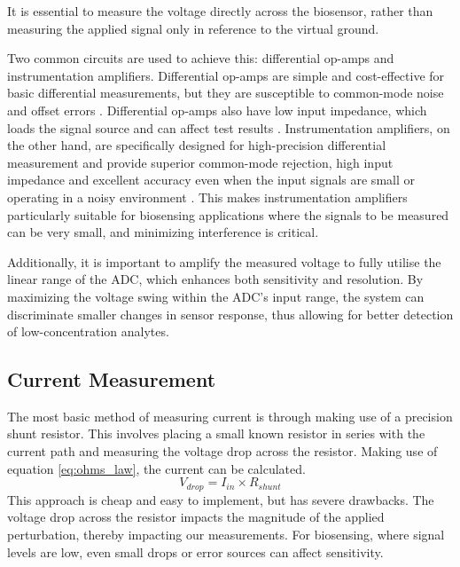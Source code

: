 It is essential to measure the voltage directly across the biosensor, rather than measuring the applied signal only in reference to the virtual ground.  

Two common circuits are used to achieve this: differential op-amps and instrumentation amplifiers. Differential op-amps are simple and cost-effective for basic differential measurements, but they are susceptible to common-mode noise and offset errors \cite{technologyWhatAreDrawbacks2024}. Differential op-amps also have low input impedance, which loads the signal source and can affect test results \cite{technologyWhatAreDrawbacks2024}. Instrumentation amplifiers, on the other hand, are specifically designed for high-precision differential measurement and provide superior common-mode rejection, high input impedance and excellent accuracy even when the input signals are small or operating in a noisy environment \cite{InstrumentationAmplifierOperational}. This makes instrumentation amplifiers particularly suitable for biosensing applications where the signals to be measured can be very small, and minimizing interference is critical.

Additionally, it is important to amplify the measured voltage to fully utilise the linear range of the \ac{ADC}, which enhances both sensitivity and resolution. By maximizing the voltage swing within the \ac{ADC}'s input range, the system can discriminate smaller changes in sensor response, thus allowing for better detection of low-concentration analytes.

\subsection{Current Measurement}
The most basic method of measuring current is through making use of a precision shunt resistor. This involves placing a small known resistor in series with the current path and measuring the voltage drop across the resistor. Making use of equation \ref{eq:ohms_law}, the current can be calculated.
\begin{equation}
    V_{drop} = I_{in} \times R_{shunt}
    \label{eq:ohms_law}
\end{equation}
This approach is cheap and easy to implement, but has severe drawbacks. The voltage drop across the resistor impacts the magnitude of the applied perturbation, thereby impacting our measurements. For biosensing, where signal levels are low, even small drops or error sources can affect sensitivity.

